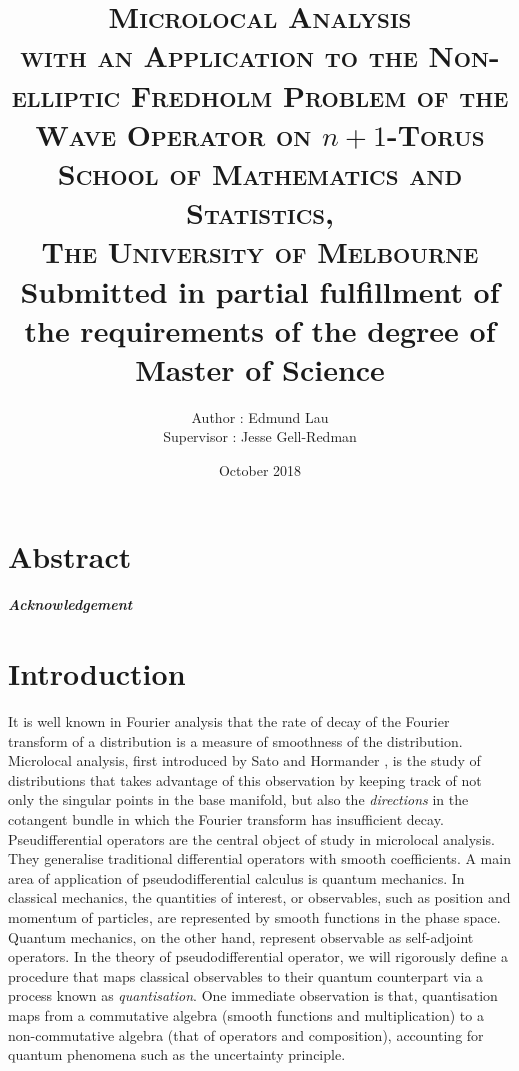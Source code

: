 \documentclass[12pt, twoside]{book}
\title{    
    \textsc{\LARGE Microlocal Analysis} \\
    \textsc{\large with an Application to the Non-elliptic Fredholm Problem of the Wave Operator on $n + 1$-Torus} \\ [5em]
    \textsc{\Large School of Mathematics and Statistics, \\ The University of Melbourne} \\ [5em]
    {\large Submitted in partial fulfillment of the requirements of the degree of Master of Science} \\
}
\author{Author : Edmund Lau \\
    Supervisor : Jesse Gell-Redman }
\date{October 2018}
\begin{document}
\maketitle



\chapter*{Abstract}




\paragraph{\LARGE Acknowledgement} \hfill 

\tableofcontents

\chapter{Introduction}
It is well known in Fourier analysis that the rate of decay of the Fourier transform of a distribution is a measure of smoothness of the distribution. Microlocal analysis, first introduced by Sato \cite{} and Hormander \cite{}, is the study of distributions that takes advantage of this observation by keeping track of not only the singular points in the base manifold, but also the \textit{directions} in the cotangent bundle in which the Fourier transform has insufficient decay. \\

Pseudifferential operators are the central object of study in microlocal analysis. They generalise traditional differential operators with smooth coefficients. A main area of application of pseudodifferential calculus is quantum mechanics. In classical  mechanics,  the quantities of interest, or  observables,  such as position and momentum of particles, are represented by smooth functions in the phase space. Quantum mechanics, on the other hand, represent observable as self-adjoint operators. In the theory of pseudodifferential operator, we will rigorously define a procedure that maps classical observables to their quantum counterpart via a process known as \textit{quantisation}. One immediate observation is that, quantisation maps from a commutative algebra (smooth functions and multiplication) to a non-commutative algebra (that of operators and composition), accounting for quantum phenomena such as the uncertainty principle. \\
\end{document}
